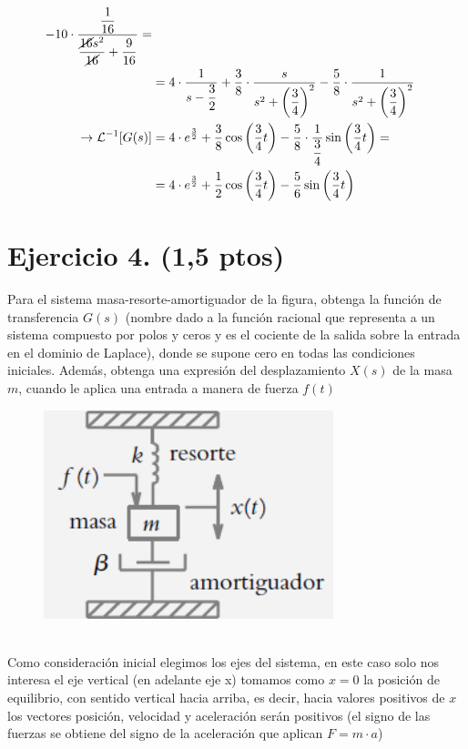 \documentclass{article}
\begin{document}
\begin{align*}
    -10 \cdot \dfrac{\dfrac{1}{16}}{\dfrac{\cancel{16}s^2}{\cancel{16}} + \dfrac{9}{16}} = \\
    &= 4 \cdot \dfrac{1}{s - \dfrac{3}{2}}
    + \dfrac{3}{8} \cdot \dfrac{s}{s^2 + \left(\dfrac{3}{4}\right)^2} 
    - \dfrac{5}{8} \cdot \dfrac{1}{s^2 + \left(\dfrac{3}{4}\right)^2} \\
    \rightarrow\mathcal{L}^{-1}[G(s)]&
    = 4 \cdot e^{\frac{3}{2}}
    + \dfrac{3}{8} \cos\left(\dfrac{3}{4}t\right)
    - \dfrac{5}{8} \cdot \dfrac{1}{\dfrac{3}{4}}\sin\left(\dfrac{3}{4}t\right) = \\
    &= 4 \cdot e^{\frac{3}{2}}
    + \dfrac{1}{2} \cos\left(\dfrac{3}{4}t\right)
    - \dfrac{5}{6} \sin\left(\dfrac{3}{4}t\right)
\end{align*}
\section*{Ejercicio 4. (1,5 ptos)}
Para el sistema masa-resorte-amortiguador de la figura, obtenga la función de transferencia \(G(s)\) (nombre dado a la función racional que representa a un sistema compuesto por polos y ceros y es el cociente de la salida sobre la entrada en el dominio de Laplace), donde se supone cero en todas las condiciones iniciales. Además, obtenga una expresión del desplazamiento \(X(s)\) de la masa \(m\), cuando le aplica una entrada a manera de fuerza \(f(t)\) \\
\begin{figure}[h]
    \includegraphics[scale=0.5]{masa-muelle-resorte.png}
    \centering
\end{figure}
\pagebreak
\\
Como consideración inicial elegimos los ejes del sistema, en este caso solo nos interesa el eje vertical (en adelante eje x) tomamos como \(x=0\) la posición de equilibrio, con sentido vertical hacia arriba, es decir, hacia valores positivos de \(x\) los vectores posición, velocidad y aceleración serán positivos (el signo de las fuerzas se obtiene del signo de la aceleración que aplican \(F = m \cdot a\))
\end{document}
